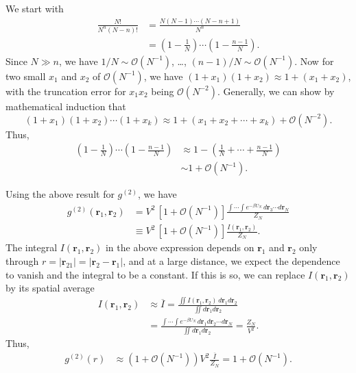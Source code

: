 \documentclass[twocolumn, 10pt]{article}
\numberwithin{equation}{section}
\newenvironment{solution}[1][\empty]
{\par\medskip\sffamily
  \textbf{\ifx\empty#1{Solution.}\relax\else{#1}\fi} \ignorespaces}
{\medskip}
\begin{document}
\begin{solution}
  We start with
  \begin{align*}
    \frac{ N! } { N^n (N-n)! }
    &=
    \frac{ N(N-1)\cdots (N-n+1) }
      { N^n }
    \\
    &=
    \left(1 - \frac{1}{N}\right)
    \cdots
    \left(1 - \frac{n-1}{N}\right).
  \end{align*}
  Since $N \gg n$, we have
  $1/N \sim \mathcal O(N^{-1})$, \dots,
  $(n-1)/N \sim \mathcal O(N^{-1})$.
  Now for two small $x_1$ and $x_2$
  of $\mathcal O(N^{-1})$, we have
  $(1+x_1)(1+x_2) \approx 1 + (x_1+x_2)$,
  with the truncation error for $x_1 x_2$
  being $\mathcal O(N^{-2})$.
  Generally,
  we can show by mathematical induction that
  $$
  (1+x_1)(1+x_2) \cdots (1 + x_k)
  \approx 1 + (x_1+x_2+\cdots + x_k) + \mathcal O(N^{-2}).
  $$
  Thus,
  \begin{align*}
    \left(1 - \frac{1}{N}\right)
    \cdots
    \left(1 - \frac{n-1}{N}\right)
    &\approx
    1-\left(
    \frac{1}{N}
    + \cdots +
    \frac{n-1}{N}
    \right)
    \\
    &\sim
    1 + \mathcal O(N^{-1}).
  \end{align*}

  Using the above result for $g^{(2)}$, we have
  \begin{align*}
    g^{(2)}(\mathbf r_1, \mathbf r_2)
    &=
    V^2 \, [1 + \mathcal O(N^{-1})]
    \frac{
      \int\cdots\int e^{-\beta U_N} \, d\mathbf r_{3}\cdots d\mathbf r_N
    } { Z_N }
    \\
    &\equiv
    V^2 \, [1 + \mathcal O(N^{-1})]
    \frac{ I(\mathbf r_1, \mathbf r_2) } { Z_N }
    .
  \end{align*}
  The integral $I(\mathbf r_1, \mathbf r_2)$
  in the above expression
  depends on $\mathbf r_1$ and $\mathbf r_2$
  only through $r = |\mathbf r_{21}| = |\mathbf r_2 - \mathbf r_1|$,
  and at a large distance,
  we expect the dependence to vanish
  and the integral to be a constant.
  If this is so, we can replace $I(\mathbf r_1, \mathbf r_2)$
  by its spatial average
  \begin{align*}
    I(\mathbf r_1, \mathbf r_2)
    &\approx
    \overline I
    =
    \frac{
      \iint
      I(\mathbf r_1, \mathbf r_2)
      \, d\mathbf r_1 d\mathbf r_2
    }
    { \iint d\mathbf r_1 d\mathbf r_2 }
    \\
    &=
    \frac{
      \int \cdots \int
      e^{-\beta U_N}
      \, d\mathbf r_1 d\mathbf r_2 \cdots d\mathbf r_N
    }
    { \iint d\mathbf r_1 d\mathbf r_2 }
    =
    \frac{ Z_N } { V^2 }
    .
  \end{align*}
  Thus,
  \begin{align*}
    g^{(2)}(r)
    &\approx
    (1 + \mathcal O(N^{-1}))
    V^2
    \frac{ \overline{ I } } { Z_N }
    =
    1 + \mathcal O(N^{-1})
    .
  \end{align*}
\end{solution}
\end{document}
